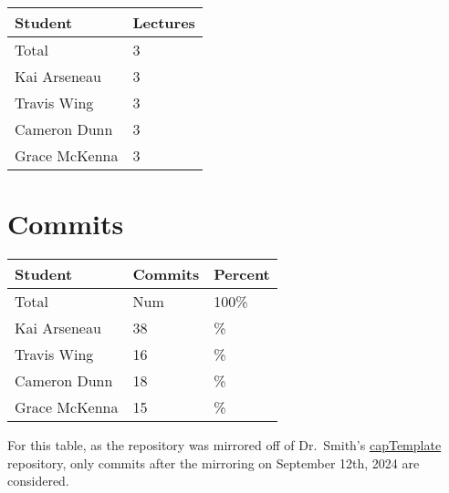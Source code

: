 \documentclass{article}
\begin{document}
\begin{table}[H]
\centering
\begin{tabular}{ll}
\toprule
\textbf{Student} & \textbf{Lectures}\\
\midrule
Total & 3\\
Kai Arseneau & 3\\
Travis Wing & 3\\
Cameron Dunn & 3\\
Grace McKenna & 3\\
\bottomrule
\end{tabular}
\end{table}


\section{Commits}


\begin{table}[H]
\centering
\begin{tabular}{lll}
\toprule
\textbf{Student} & \textbf{Commits} & \textbf{Percent}\\
\midrule
Total & Num & 100\% \\
Kai Arseneau & 38 & \% \\
Travis Wing & 16 & \% \\
Cameron Dunn & 18 & \% \\
Grace McKenna & 15 & \% \\
\bottomrule
\end{tabular}
\end{table}

For this table, as the repository was mirrored off of Dr.~Smith's \href{https://github.com/smiths/capTemplate}{capTemplate} repository, only commits after the mirroring on September 12th, 2024 are considered.
\end{document}
